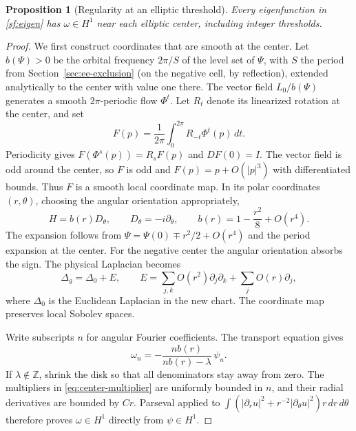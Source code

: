 \documentclass[reqno,11pt]{amsart}
\numberwithin{equation}{section}
\newtheorem{proposition}[theorem]{Proposition}
\theoremstyle{remark}
\begin{document}
\begin{proposition}[Regularity at an elliptic threshold]
\label{prop:center-regularity}
Every eigenfunction in \eqref{sf:eigen} has $\omega\in H^1$ near
each elliptic center, including integer thresholds.
\end{proposition}

\begin{proof}
We first construct coordinates that are smooth at the center.
Let $b(\Psi)>0$ be the orbital frequency $2\pi/S$ of the level set
of $\Psi$, with $S$ the period from Section~\ref{sec:ee-exclusion}
(on the negative cell, by reflection), extended analytically to the
center with value one there.  The vector field
$L_0/b(\Psi)$ generates a smooth $2\pi$-periodic flow
$\Phi^t$.  Let $R_t$ denote its linearized rotation at the
center, and set
\[
 F(p)=\frac1{2\pi}\int_0^{2\pi}R_{-t}\Phi^t(p)\,dt.
\]
Periodicity gives $F(\Phi^s(p))=R_sF(p)$ and $DF(0)=I$.
The vector field is odd around the center, so $F$ is odd and
$F(p)=p+O(|p|^3)$ with differentiated bounds.
Thus $F$ is a smooth local coordinate map.  In its polar
coordinates $(r,\theta)$, choosing the angular orientation
appropriately,
\begin{equation}
 H=b(r)D_\theta,\qquad
 D_\theta=-i\partial_\theta,\qquad
 b(r)=1-\frac{r^2}{8}+O(r^4).
 \label{eq:center-smooth-coordinates}
\end{equation}
The expansion follows from
$\Psi=\Psi(0)\mp r^2/2+O(r^4)$ and the period expansion at
the center.  For the negative center the angular orientation
absorbs the sign.  The physical Laplacian becomes
\begin{equation}
 \Delta_g=\Delta_0+E,\qquad
 E=\sum_{j,k}O(r^2)\partial_j\partial_k
                  +\sum_jO(r)\partial_j,
 \label{eq:center-laplacian-error}
\end{equation}
where $\Delta_0$ is the Euclidean Laplacian in the new chart.
The coordinate map preserves local Sobolev spaces.

Write subscripts $n$ for angular Fourier coefficients.
The transport equation gives
\begin{equation}
 \omega_n=-\frac{n b(r)}{n b(r)-\lambda}\,\psi_n.
 \label{eq:center-multiplier}
\end{equation}
If $\lambda\notin\mathbb Z$, shrink the disk so that all
denominators stay away from zero.  The multipliers in
\eqref{eq:center-multiplier} are uniformly bounded in $n$,
and their radial derivatives are bounded by $Cr$.
Parseval applied to
$\int(|\partial_r u|^2+r^{-2}|\partial_\theta u|^2)r\,dr\,d\theta$
therefore proves $\omega\in H^1$ directly from $\psi\in H^1$.


\end{proof}
\end{document}
